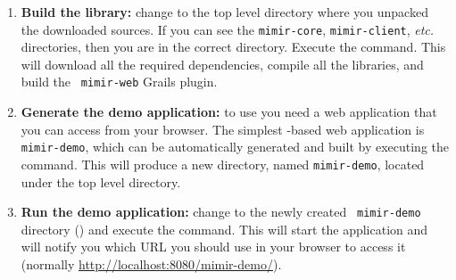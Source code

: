 \begin{enumerate}
  Alternatively, if 
  Subversion\footnote{\url{http://subversion.apache.org/}} is installed on your
  system, you can check out the sources directly from our SourceForge repository
  by executing the following command:\\.
  The URL used in the command is for the {\tt trunk} version; adjust accordingly
  to point to one of the tags, if you require a release version instead. This
  will create a new directory called {\tt mimir} containing all the source
  files.
  \item {\bf Build the library:} change to the top level directory where you
  unpacked the downloaded \Mimir{} sources. If you can see the {\tt mimir-core},
  {\tt mimir-client}, {\em etc.} directories, then you are in the correct
  directory. Execute the  command. This will download all the
  required dependencies, compile all the \Mimir{} libraries, and build the {\tt
  mimir-web} Grails plugin.
  \item {\bf Generate the demo application:} to use \Mimir{} you need a web
  application that you can access from your browser. The simplest \Mimir{}-based
  web application is {\tt mimir-demo}, which can be automatically generated
  and built by executing the  command. This will produce a
  new directory, named {\tt mimir-demo}, located under the top level \Mimir{}
  directory.
  \item {\bf Run the demo application:}  change to the newly created {\tt
  mimir-demo} directory () and execute the  command. This will start the application and will notify you which
  URL you should use in your browser to access it (normally
  \url{http://localhost:8080/mimir-demo/}).
\end{enumerate}
%
